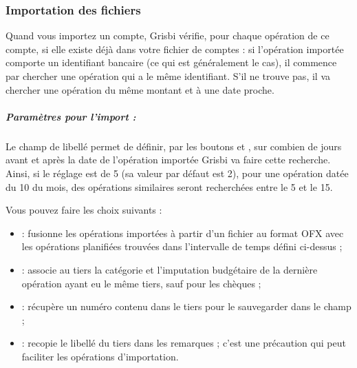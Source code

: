 \subsubsection{Importation des fichiers\label{setup-general-import-files}} 



Quand vous importez un compte, Grisbi vérifie, pour chaque opération de ce compte, si elle existe déjà dans votre fichier de comptes : si l'opération importée comporte un identifiant bancaire (ce qui est généralement le cas), il commence par chercher une opération qui a le même identifiant. S'il ne trouve pas, il va chercher une opération du même montant et à une date proche.


\subparagraph{Paramètres pour l'import :\label{setup-general-import-files-parameters}}


Le champ de libellé  permet de définir, par les boutons \menu{+} et \menu{-}, sur combien de jours avant et après la date de l'opération importée Grisbi va faire cette recherche. Ainsi, si le réglage est de 5 (sa valeur par défaut est 2), pour une opération datée du 10 du mois, des opérations similaires seront recherchées entre le 5 et le 15.

Vous pouvez faire les choix suivants :

\begin{itemize}
	\item {} : fusionne les opérations importées à partir d'un fichier au format \gls{OFX} avec les opérations planifiées trouvées dans l'intervalle de temps défini ci-dessus ;
	\item {} : associe au tiers la catégorie et l'imputation budgétaire de la dernière opération ayant eu le même tiers, sauf pour les chèques ;
	\item {} : récupère un numéro contenu dans le tiers pour le sauvegarder dans le champ  ;
	\item {} : recopie le libellé du tiers dans les remarques ; c'est une précaution qui peut faciliter les opérations d'importation.
	
\end{itemize}


